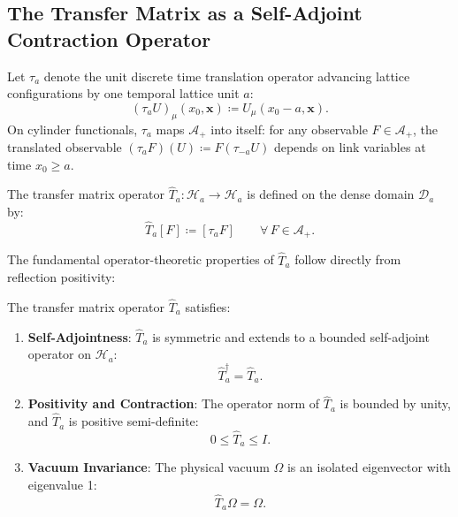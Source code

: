 \subsection{The Transfer Matrix as a Self-Adjoint Contraction Operator}
\label{subsec:transfer_matrix_operator}
Let $\tau_a$ denote the unit discrete time translation operator advancing lattice configurations by one temporal lattice unit $a$:
\begin{equation}
(\tau_a U)_\mu(x_0, \mathbf{x}) \coloneqq U_\mu(x_0 - a, \mathbf{x}).
\end{equation}
On cylinder functionals, $\tau_a$ maps $\mathcal{A}_+$ into itself: for any observable $F \in \mathcal{A}_+$, the translated observable $(\tau_a F)(U) \coloneqq F(\tau_{-a} U)$ depends on link variables at time $x_0 \ge a$.

\begin{definition}
The transfer matrix operator $\hat{T}_a : \mathcal{H}_a \to \mathcal{H}_a$ is defined on the dense domain $\mathcal{D}_a$ by:
\begin{equation}
\label{eq:transfer_matrix_action}
\hat{T}_a [F] \coloneqq [\tau_a F] \qquad \forall \, F \in \mathcal{A}_+.
\end{equation}
\end{definition}

The fundamental operator-theoretic properties of $\hat{T}_a$ follow directly from reflection positivity:
\begin{theorem}
\label{thm:transfer_matrix_properties}
The transfer matrix operator $\hat{T}_a$ satisfies:
\begin{enumerate}
    \item \textbf{Self-Adjointness}: $\hat{T}_a$ is symmetric and extends to a bounded self-adjoint operator on $\mathcal{H}_a$:
    \begin{equation}
    \hat{T}_a^\dagger = \hat{T}_a.
    \end{equation}
    \item \textbf{Positivity and Contraction}: The operator norm of $\hat{T}_a$ is bounded by unity, and $\hat{T}_a$ is positive semi-definite:
    \begin{equation}
    0 \le \hat{T}_a \le I.
    \end{equation}
    \item \textbf{Vacuum Invariance}: The physical vacuum $\Omega$ is an isolated eigenvector with eigenvalue 1:
    \begin{equation}
    \hat{T}_a \Omega = \Omega.
    \end{equation}
\end{enumerate}
\end{theorem}

